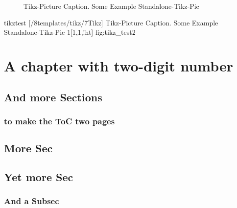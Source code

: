 \np
%
\begin{figure}[!htpb]
    \centering
    \caption{Tikz-Picture Caption. Some Example Standalone-Tikz-Pic}
    \label{fig:tikz_test}
\end{figure}
%
%
\tikzabb%
{tikztest}%
[\DenKrLayoutMainRootDir/8templates/tikz/7Tikz]%
{%
Tikz-Picture Caption. Some Example Standalone-Tikz-Pic
}%
{1}[1,1,!ht]%
{fig:tikz_test2}%
%
%



\setcounter{chapter}{9}
\chapter{A chapter with two-digit number}
\section{And more Sections}
\subsection{to make the ToC two pages}
\section{More Sec}
\section{Yet more Sec}
\subsection{And a Subsec}